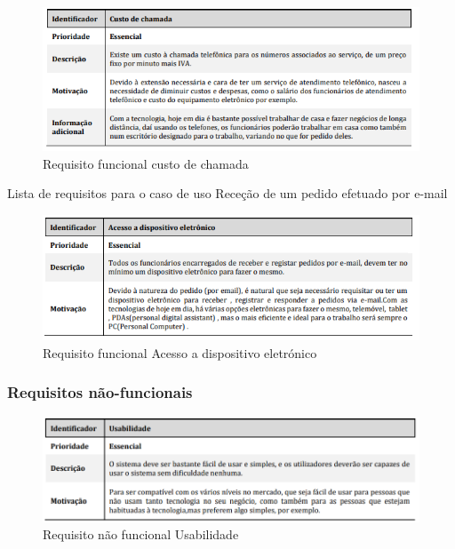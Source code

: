 \begin{figure}[H]
	\centering
	\includegraphics[width=15cm]{requisitofuncional7}
	\caption{Requisito funcional custo de chamada}
	\label{fig:requisitofuncional7}
\end{figure}

Lista de requisitos para o caso de uso Receção de um pedido efetuado por e-mail\\

\begin{figure}[H]
	\centering
	\includegraphics[width=15cm]{requisitofuncional8}
	\caption{Requisito funcional Acesso a dispositivo eletrónico}
	\label{fig:requisitofuncional8}
\end{figure}

\subsubsection{Requisitos não-funcionais}

\begin{figure}[H]
	\centering
	\includegraphics[width=15cm]{requisito_nao_funcional1}
	\caption{Requisito não funcional Usabilidade}
	\label{fig:requisitonaofuncional1}
\end{figure}

